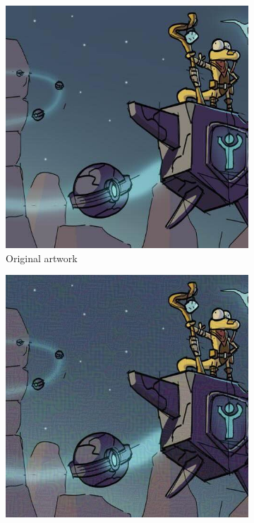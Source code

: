 \documentclass{article}
\begin{document}
\begin{figure}[h]
    \centering
        \begin{subfigure}[b]{0.195\textwidth}
         \centering
         \includegraphics[width=\textwidth]{plots/noisyups/0001_nulevoy_clean.jpg}
         \caption{Original artwork}
     \end{subfigure}
     \begin{subfigure}[b]{0.195\textwidth}
         \centering
         \includegraphics[width=\textwidth]{plots/noisyups/0001_nulevoy_protected.jpg}

\end{subfigure}
\end{figure}
\end{document}
